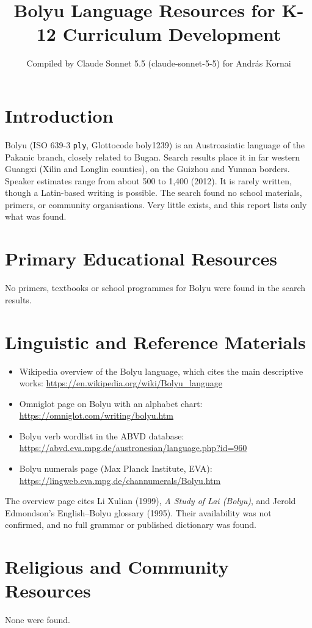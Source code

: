 \documentclass[12pt]{article}
\title{Bolyu Language Resources for K-12 Curriculum Development}
\author{Compiled by Claude Sonnet 5.5 (claude-sonnet-5-5) for Andr\'as Kornai}
\date{}
\begin{document}
\maketitle

\section{Introduction}
Bolyu (ISO 639-3 \texttt{ply}, Glottocode boly1239) is an Austroasiatic language of the Pakanic branch, closely related to Bugan. Search results place it in far western Guangxi (Xilin and Longlin counties), on the Guizhou and Yunnan borders. Speaker estimates range from about 500 to 1,400 (2012). It is rarely written, though a Latin-based writing is possible. The search found no school materials, primers, or community organisations. Very little exists, and this report lists only what was found.

\section{Primary Educational Resources}
No primers, textbooks or school programmes for Bolyu were found in the search results.

\section{Linguistic and Reference Materials}
\begin{itemize}
\item Wikipedia overview of the Bolyu language, which cites the main descriptive works: \url{https://en.wikipedia.org/wiki/Bolyu_language}
\item Omniglot page on Bolyu with an alphabet chart: \url{https://omniglot.com/writing/bolyu.htm}
\item Bolyu verb wordlist in the ABVD database: \url{https://abvd.eva.mpg.de/austronesian/language.php?id=960}
\item Bolyu numerals page (Max Planck Institute, EVA): \url{https://lingweb.eva.mpg.de/channumerals/Bolyu.htm}
\end{itemize}
The overview page cites Li Xulian (1999), \emph{A Study of Lai (Bolyu)}, and Jerold Edmondson's English--Bolyu glossary (1995). Their availability was not confirmed, and no full grammar or published dictionary was found.

\section{Religious and Community Resources}
None were found.
\end{document}
